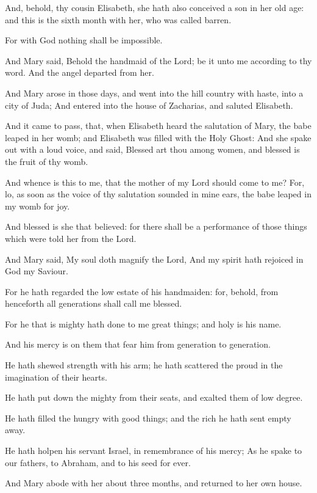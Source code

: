 \Verse And, behold, thy cousin Elisabeth, she hath also conceived a son in her old age: and this is the sixth month with her, who was called barren.

\Verse For with God nothing shall be impossible.

\Verse And Mary said, Behold the handmaid of the Lord; be it unto me according to thy word. And the angel departed from her.

\Verse And Mary arose in those days, and went into the hill country with haste, into a city of Juda; \Verse And entered into the house of Zacharias, and saluted Elisabeth.

\Verse And it came to pass, that, when Elisabeth heard the salutation of Mary, the babe leaped in her womb; and Elisabeth was filled with the Holy Ghost: \Verse And she spake out with a loud voice, and said, Blessed art thou among women, and blessed is the fruit of thy womb.

\Verse And whence is this to me, that the mother of my Lord should come to me?  \Verse For, lo, as soon as the voice of thy salutation sounded in mine ears, the babe leaped in my womb for joy.

\Verse And blessed is she that believed: for there shall be a performance of those things which were told her from the Lord.

\Verse And Mary said, My soul doth magnify the Lord, \Verse And my spirit hath rejoiced in God my Saviour.

\Verse For he hath regarded the low estate of his handmaiden: for, behold, from henceforth all generations shall call me blessed.

\Verse For he that is mighty hath done to me great things; and holy is his name.

\Verse And his mercy is on them that fear him from generation to generation.

\Verse He hath shewed strength with his arm; he hath scattered the proud in the imagination of their hearts.

\Verse He hath put down the mighty from their seats, and exalted them of low degree.

\Verse He hath filled the hungry with good things; and the rich he hath sent empty away.

\Verse He hath holpen his servant Israel, in remembrance of his mercy; \Verse As he spake to our fathers, to Abraham, and to his seed for ever.

\Verse And Mary abode with her about three months, and returned to her own house.

